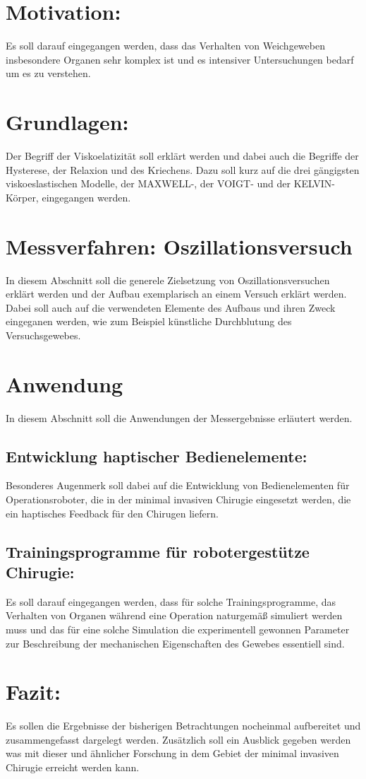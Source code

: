 \documentclass[11pt]{article}
\begin{document}
	\section{Motivation:}
		Es soll darauf eingegangen werden, dass das Verhalten von Weichgeweben insbesondere Organen
		sehr komplex ist und es intensiver Untersuchungen bedarf um es zu verstehen.
	\section{Grundlagen:}
			Der Begriff der Viskoelatizität soll erklärt werden und dabei auch die Begriffe der
			Hysterese, der Relaxion und des Kriechens. Dazu soll kurz auf die drei gängigsten 
			viskoeslastischen  Modelle, der MAXWELL-, der VOIGT- und
			der KELVIN-Körper, eingegangen werden.

	\section{Messverfahren: Oszillationsversuch}
		In diesem Abschnitt soll die generele Zielsetzung von Oszillationsversuchen erklärt werden
		und der Aufbau exemplarisch an einem Versuch erklärt werden. Dabei soll auch auf die
		verwendeten Elemente des Aufbaus und ihren Zweck eingeganen werden, wie zum Beispiel 
		künstliche Durchblutung des Versuchsgewebes.
		
	\section{Anwendung}
		In diesem Abschnitt soll die Anwendungen der Messergebnisse erläutert werden. 
		\subsection{Entwicklung haptischer Bedienelemente:}
			Besonderes Augenmerk soll dabei auf die Entwicklung von Bedienelementen für 
			Operationsroboter, die in der minimal invasiven Chirugie eingesetzt werden, die 
			ein haptisches Feedback für den Chirugen liefern.
			
		\subsection{Trainingsprogramme für robotergestütze Chirugie:}
			Es soll darauf eingegangen werden, dass für solche Trainingsprogramme, das Verhalten von
			Organen während eine Operation naturgemäß simuliert werden muss und das für eine solche 
			Simulation die experimentell gewonnen Parameter zur Beschreibung der mechanischen 
			Eigenschaften des Gewebes essentiell sind.
			
	\section{Fazit:}
			Es sollen die Ergebnisse der bisherigen Betrachtungen nocheinmal aufbereitet und 
			zusammengefasst dargelegt werden. Zusätzlich soll ein Ausblick gegeben werden was 
			mit dieser und ähnlicher Forschung in dem Gebiet der minimal invasiven Chirugie erreicht
			werden kann.   
			 
		  
\end{document}
